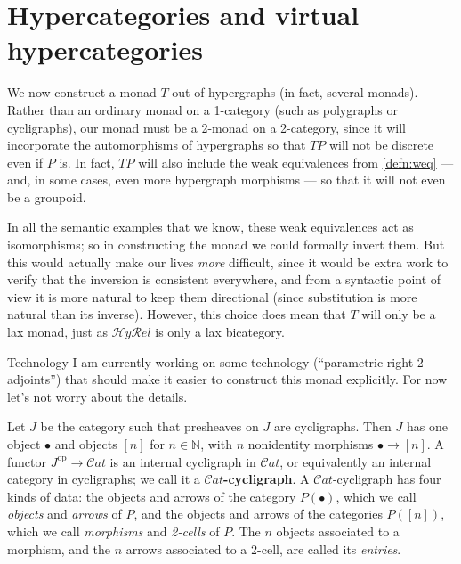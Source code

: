 \documentclass{article}
\theoremstyle{definition}
\theoremstyle{remark}
\def\Cat{\ensuremath{\mathcal{C}\mathit{at}}}
\def\op{^{\mathrm{op}}}
\def\N{\mathbb{N}}
\def\hyrel{\mathcal{H}\mathit{y}\mathcal{R}\mathit{el}}
\begin{document}
\section{Hypercategories and virtual hypercategories}
\label{sec:hypercats}

We now construct a monad $T$ out of hypergraphs (in fact, several monads).
Rather than an ordinary monad on a 1-category (such as polygraphs or cycligraphs), our monad must be a 2-monad on a 2-category, since it will incorporate the automorphisms of hypergraphs so that $T P$ will not be discrete even if $P$ is.
In fact, $T P$ will also include the weak equivalences from \cref{defn:weq} --- and, in some cases, even more hypergraph morphisms --- so that it will not even be a groupoid.

In all the semantic examples that we know, these weak equivalences act as isomorphisms; so in constructing the monad we could formally invert them.
But this would actually make our lives \emph{more} difficult, since it would be extra work to verify that the inversion is consistent everywhere, and from a syntactic point of view it is more natural to keep them directional (since substitution is more natural than its inverse).
However, this choice does mean that $T$ will only be a lax monad, just as $\hyrel$ is only a lax bicategory.

\begin{anfxnote}{Technology}
  I am currently working on some technology (``parametric right 2-adjoints'') that should make it easier to construct this monad explicitly.
  For now let's not worry about the details.
\end{anfxnote}

Let $J$ be the category such that presheaves on $J$ are cycligraphs.
Then $J$ has one object $\bullet$ and objects $[n]$ for $n\in\N$, with $n$ nonidentity morphisms $\bullet\to [n]$.
A functor $J\op\to\Cat$ is an internal cycligraph in \Cat, or equivalently an internal category in cycligraphs; we call it a \textbf{\Cat-cycligraph}.
A \Cat-cycligraph has four kinds of data: the objects and arrows of the category $P(\bullet)$, which we call \emph{objects} and \emph{arrows} of $P$, and the objects and arrows of the categories $P([n])$, which we call \emph{morphisms} and \emph{2-cells} of $P$.
The $n$ objects associated to a morphism, and the $n$ arrows associated to a 2-cell, are called its \emph{entries}.
\end{document}
